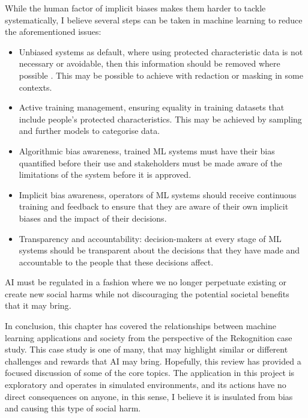 \documentclass[]{final_report}
\begin{document}
While the human factor of implicit biases makes them harder to tackle systematically, I believe several steps can be taken in machine learning to reduce  the aforementioned issues:
\begin{itemize}
  \item Unbiased systems as default, where using protected characteristic data is not necessary or avoidable, then this information should be removed where possible \cite{AIRisksAndPrinciples}. This may be possible to achieve with redaction or masking in some contexts. 
  \item Active training management, ensuring equality in training datasets that include people's protected characteristics. This may be achieved by sampling and further models to categorise data\cite{AIRisksAndPrinciples}. 
  \item Algorithmic bias awareness, trained ML systems must have their bias quantified before their use and stakeholders must be made aware of the limitations of the system before it is approved\cite{AIRisksAndPrinciples}.
  \item Implicit bias awareness, operators of ML systems should receive continuous training and feedback to ensure that they are aware of their own implicit biases and the impact of their decisions\cite{facialRecognitionBias}.
  \item Transparency and accountability: decision-makers at every stage of ML systems should be transparent about the decisions that they have made and accountable to the people that these decisions affect\cite{AIRisksAndPrinciples}.
\end{itemize}
AI must be regulated in a fashion where we no longer perpetuate existing or create new social harms while not discouraging the potential societal benefits that it may bring\cite{AIRisksAndPrinciples}. 


In conclusion, this chapter has covered the relationships between machine learning applications and society from the perspective of the Rekognition case study. 
This case study is one of many, that may highlight similar or different challenges and rewards that AI may bring. Hopefully, this review has provided a focused discussion of some of the core topics. The application in this project is exploratory and operates in simulated environments, and its actions have no direct consequences on anyone, in this sense, I believe it is insulated from bias and causing this type of social harm. 



\end{document}
